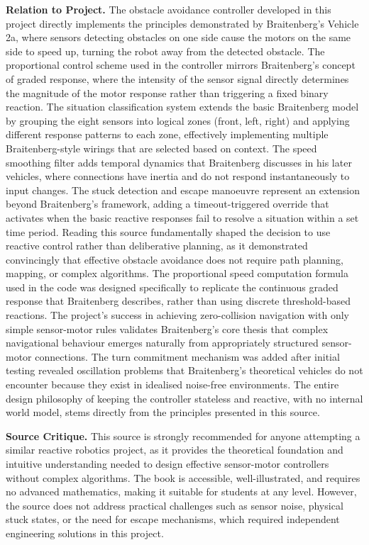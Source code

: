 \documentclass[12pt, a4paper]{article}
\begin{document}
\textbf{Relation to Project.} The obstacle avoidance controller developed in this project directly implements the principles demonstrated by Braitenberg's Vehicle 2a, where sensors detecting obstacles on one side cause the motors on the same side to speed up, turning the robot away from the detected obstacle. The proportional control scheme used in the controller mirrors Braitenberg's concept of graded response, where the intensity of the sensor signal directly determines the magnitude of the motor response rather than triggering a fixed binary reaction. The situation classification system extends the basic Braitenberg model by grouping the eight sensors into logical zones (front, left, right) and applying different response patterns to each zone, effectively implementing multiple Braitenberg-style wirings that are selected based on context. The speed smoothing filter adds temporal dynamics that Braitenberg discusses in his later vehicles, where connections have inertia and do not respond instantaneously to input changes. The stuck detection and escape manoeuvre represent an extension beyond Braitenberg's framework, adding a timeout-triggered override that activates when the basic reactive responses fail to resolve a situation within a set time period. Reading this source fundamentally shaped the decision to use reactive control rather than deliberative planning, as it demonstrated convincingly that effective obstacle avoidance does not require path planning, mapping, or complex algorithms. The proportional speed computation formula used in the code was designed specifically to replicate the continuous graded response that Braitenberg describes, rather than using discrete threshold-based reactions. The project's success in achieving zero-collision navigation with only simple sensor-motor rules validates Braitenberg's core thesis that complex navigational behaviour emerges naturally from appropriately structured sensor-motor connections. The turn commitment mechanism was added after initial testing revealed oscillation problems that Braitenberg's theoretical vehicles do not encounter because they exist in idealised noise-free environments. The entire design philosophy of keeping the controller stateless and reactive, with no internal world model, stems directly from the principles presented in this source.

\vspace{0.6cm}

\textbf{Source Critique.} This source is strongly recommended for anyone attempting a similar reactive robotics project, as it provides the theoretical foundation and intuitive understanding needed to design effective sensor-motor controllers without complex algorithms. The book is accessible, well-illustrated, and requires no advanced mathematics, making it suitable for students at any level. However, the source does not address practical challenges such as sensor noise, physical stuck states, or the need for escape mechanisms, which required independent engineering solutions in this project.
\end{document}

